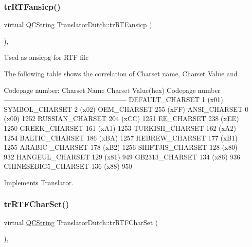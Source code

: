 \subsubsection{\texorpdfstring{trRTFansicp()}{trRTFansicp()}}
{\footnotesize\ttfamily virtual \mbox{\hyperlink{class_q_c_string}{Q\+C\+String}} Translator\+Dutch\+::tr\+R\+T\+Fansicp (\begin{DoxyParamCaption}{ }\end{DoxyParamCaption})\hspace{0.3cm}{\ttfamily [inline]}, {\ttfamily [virtual]}}

Used as ansicpg for R\+TF file

The following table shows the correlation of Charset name, Charset Value and 
\begin{DoxyPre}
Codepage number:
Charset Name       Charset Value(hex)  Codepage number
------------------------------------------------------
DEFAULT\_CHARSET           1 (x01)
SYMBOL\_CHARSET            2 (x02)
OEM\_CHARSET             255 (xFF)
ANSI\_CHARSET              0 (x00)            1252
RUSSIAN\_CHARSET         204 (xCC)            1251
EE\_CHARSET              238 (xEE)            1250
GREEK\_CHARSET           161 (xA1)            1253
TURKISH\_CHARSET         162 (xA2)            1254
BALTIC\_CHARSET          186 (xBA)            1257
HEBREW\_CHARSET          177 (xB1)            1255
ARABIC \_CHARSET         178 (xB2)            1256
SHIFTJIS\_CHARSET        128 (x80)             932
HANGEUL\_CHARSET         129 (x81)             949
GB2313\_CHARSET          134 (x86)             936
CHINESEBIG5\_CHARSET     136 (x88)             950
\end{DoxyPre}
 

Implements \mbox{\hyperlink{class_translator_a9953a4c0e6a4fc7d017abcd5c2939e0f}{Translator}}.

\mbox{\label{class_translator_dutch_aefa5abdf5065d86bc2a02c95c301118a}} 
\subsubsection{\texorpdfstring{trRTFCharSet()}{trRTFCharSet()}}
{\footnotesize\ttfamily virtual \mbox{\hyperlink{class_q_c_string}{Q\+C\+String}} Translator\+Dutch\+::tr\+R\+T\+F\+Char\+Set (\begin{DoxyParamCaption}{ }\end{DoxyParamCaption})\hspace{0.3cm}{\ttfamily [inline]}, {\ttfamily [virtual]}}

